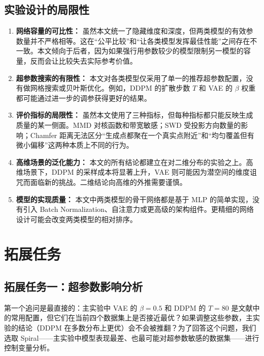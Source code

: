 \documentclass[UTF8,a4paper,12pt]{ctexart}
\begin{document}
\subsection{实验设计的局限性}

\begin{enumerate}
    \item \textbf{网络容量的可比性：} 虽然本文统一了隐藏维度和深度，但两类模型的有效参数量并不严格相等。这在“公平比较”和“让各类模型发挥最佳性能”之间存在不一致。本文倾向于后者，因为如果强行用参数较少的模型限制另一模型的容量，反而会让比较失去实际参考价值。

    \item \textbf{超参数搜索的有限性：} 本文对各类模型仅采用了单一的推荐超参数配置，没有做网格搜索或贝叶斯优化。例如，DDPM 的扩散步数 $T$ 和 VAE 的 $\beta$ 权重都可能通过进一步的调参获得更好的结果。

    \item \textbf{评价指标的局限性：} 虽然本文使用了三种指标，但每种指标都只能反映生成质量的某一侧面。MMD 对核函数和带宽敏感；SWD 受投影方向数量的影响；Chamfer 距离无法区分“生成点都聚在一个真实点附近”和“均匀覆盖但有微小偏移”这两种本质上不同的行为。

    \item \textbf{高维场景的泛化能力：} 本文的所有结论都建立在对二维分布的实验之上。高维场景下，DDPM 的采样成本将显著上升，VAE 则可能因为潜空间的维度诅咒而面临新的挑战。二维结论向高维的外推需要谨慎。

    \item \textbf{模型的实现质量：} 本文中两类模型的骨干网络都是基于 MLP 的简单实现，没有引入 Batch Normalization、自注意力或更高级的架构组件。更精细的网络设计可能会改变两类模型的相对排序。
\end{enumerate}

\section{拓展任务}
\label{sec:extension}

\subsection{拓展任务一：超参数影响分析}

第一个追问是最直接的：主实验中 VAE 的 $\beta=0.5$ 和 DDPM 的 $T=80$ 是文献中的常用配置，但它们在当前四个数据集上是否接近最优？如果调整这些参数，主实验的结论（DDPM 在多数分布上更优）会不会被推翻？为了回答这个问题，我们选取 Spiral——主实验中模型表现最差、也最可能对超参数敏感的数据集——进行控制变量分析。
\end{document}
